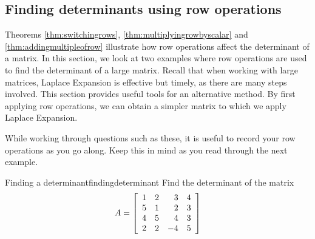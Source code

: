 \subsection{Finding determinants using row operations}

Theorems \ref{thm:switchingrows}, \ref{thm:multiplyingrowbyscalar} and \ref{thm:addingmultipleofrow} illustrate 
how row operations affect the determinant of a matrix. In this section, we look at two examples where row operations are 
used to find the determinant of a large matrix. Recall that when working with large matrices, Laplace Expansion
is effective but timely, as there are many steps involved. This section provides useful tools for
an alternative method. By first applying row operations, we can obtain a simpler matrix to which we apply Laplace Expansion. 

While working through questions such as these, it is useful to record your row operations as you go along. Keep this in mind
as you read through the next example. 

\begin{example}{Finding a determinant}{findingdeterminant}
Find the determinant of the matrix
\begin{equation*}
A=\left[
\begin{array}{rrrr}
1 & 2 & 3 & 4 \\
5 & 1 & 2 & 3 \\
4 & 5 & 4 & 3 \\
2 & 2 & -4 & 5
\end{array}
\right]
\end{equation*}
\end{example}

